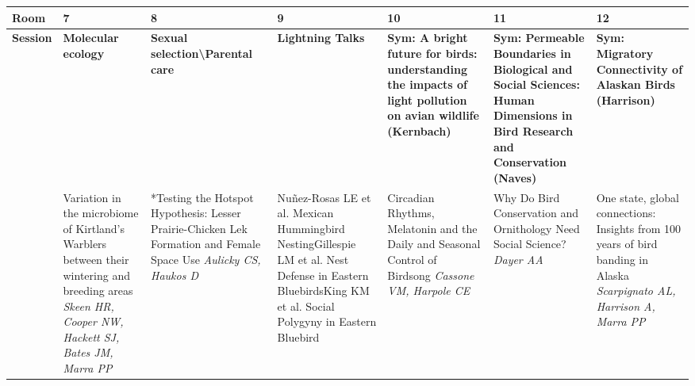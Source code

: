 \begin{tabular}{|x{0.75cm}|x{2.25cm}|x{2.25cm}|x{2.25cm}|a{2.25cm}|a{2.25cm}|a{2.25cm}|}\hline
Room & 7 & 8 & 9 & 10 & 11 & 12\\
\hline
\rule{0pt}{1em} \textbf{Session} &\footnotesize \textbf{Molecular ecology} & \footnotesize \textbf{Sexual selection\textbackslash Parental care} & \footnotesize \textbf{Lightning Talks} & \footnotesize \textbf{Sym: A bright future for birds: understanding the impacts of light pollution on avian wildlife (Kernbach)} & \footnotesize \textbf{Sym: Permeable Boundaries in Biological and Social Sciences: Human Dimensions in Bird Research and Conservation (Naves)} & \footnotesize \textbf{Sym: Migratory Connectivity of Alaskan Birds (Harrison)}\\
\hline
{}&Variation in the microbiome of Kirtland’s Warblers between their wintering and breeding areas \newline \newline \textit{Skeen HR, Cooper NW, Hackett SJ, Bates JM, Marra PP} & *Testing the Hotspot Hypothesis: Lesser Prairie-Chicken Lek Formation and Female Space Use \newline \newline \textit{Aulicky CS, Haukos D} & \scriptsize Nuñez-Rosas LE et al. \newline \tiny Mexican Hummingbird Nesting\newline \newline \scriptsize Gillespie LM et al. \newline \tiny Nest Defense in Eastern Bluebirds\newline \newline \scriptsize King KM et al. \newline \tiny Social Polygyny in Eastern Bluebird & Circadian Rhythms, Melatonin and the Daily and Seasonal Control of Birdsong \newline \newline \textit{Cassone VM, Harpole CE} & Why Do Bird Conservation and Ornithology Need Social Science? \newline \newline \textit{Dayer AA} & One state, global connections: Insights from 100 years of bird banding in Alaska \newline \newline \textit{Scarpignato AL, Harrison A, Marra PP}\\
\hline

\end{tabular}
